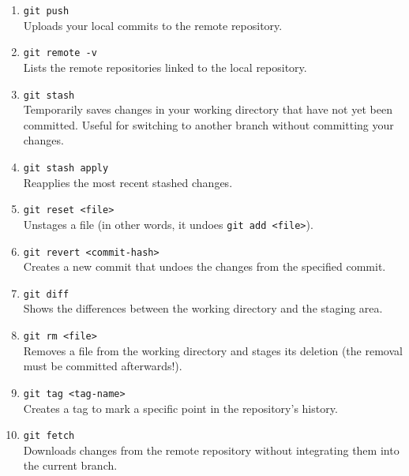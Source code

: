 \documentclass[12pt]{article}
\begin{document}
\begin{enumerate}
    \item \texttt{git push} \\
        Uploads your local commits to the remote repository.

    \item \texttt{git remote -v} \\
        Lists the remote repositories linked to the local repository.

    \item \texttt{git stash} \\
        Temporarily saves changes in your working directory that have not yet
        been committed. Useful for switching to another branch without
        committing your changes.

    \item \texttt{git stash apply} \\
        Reapplies the most recent stashed changes.

    \item \texttt{git reset <file>} \\
        Unstages a file (in other words, it undoes \texttt{git add <file>}).

    \item \texttt{git revert <commit-hash>} \\
        Creates a new commit that undoes the changes from the specified commit.

    \item \texttt{git diff} \\
        Shows the differences between the working directory and the staging
        area.

    \item \texttt{git rm <file>} \\
        Removes a file from the working directory and stages its deletion (the
        removal must be committed afterwards!).

    \item \texttt{git tag <tag-name>} \\
        Creates a tag to mark a specific point in the repository’s history.

    \item \texttt{git fetch} \\
        Downloads changes from the remote repository without integrating them
        into the current branch.

\end{enumerate}

\end{document}
